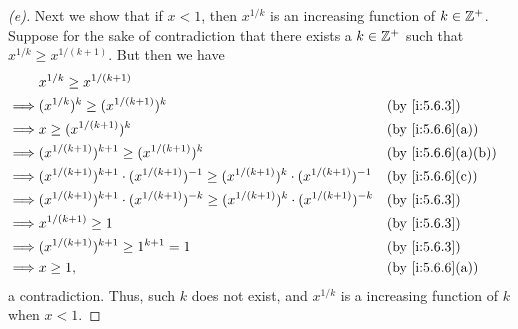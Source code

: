 \begin{proof}[(e)]
  Next we show that if \(x < 1\), then \(x^{1 / k}\) is an increasing function of \(k \in \mathbb{Z}^+\).
  Suppose for the sake of contradiction that there exists a \(k \in \mathbb{Z}^+\) such that \(x^{1 / k} \geq x^{1 / (k + 1)}\).
  But then we have
  \begin{align*}
             & x^{1 / k} \geq x^{1 / (k + 1)}                                                                                                      \\
    \implies & (x^{1 / k})^k \geq (x^{1 / (k + 1)})^k                                                                       &  & \by{i:5.6.3}      \\
    \implies & x \geq (x^{1 / (k + 1)})^k                                                                                   &  & \by{i:5.6.6}[a]   \\
    \implies & (x^{1 / (k + 1)})^{k + 1} \geq (x^{1 / (k + 1)})^k                                                           &  & \by{i:5.6.6}[a,b] \\
    \implies & (x^{1 / (k + 1)})^{k + 1} \cdot (x^{1 / (k + 1)})^{-1} \geq (x^{1 / (k + 1)})^k \cdot (x^{1 / (k + 1)})^{-1} &  & \by{i:5.6.6}[c]   \\
    \implies & (x^{1 / (k + 1)})^{k + 1} \cdot (x^{1 / (k + 1)})^{-k} \geq (x^{1 / (k + 1)})^k \cdot (x^{1 / (k + 1)})^{-k} &  & \by{i:5.6.3}      \\
    \implies & x^{1 / (k + 1)} \geq 1                                                                                       &  & \by{i:5.6.3}      \\
    \implies & (x^{1 / (k + 1)})^{k + 1} \geq 1^{k + 1} = 1                                                                 &  & \by{i:5.6.3}      \\
    \implies & x \geq 1,                                                                                                    &  & \by{i:5.6.6}[a]
  \end{align*}
  a contradiction.
  Thus, such \(k\) does not exist, and \(x^{1 / k}\) is a increasing function of \(k\) when \(x < 1\).


\end{proof}
